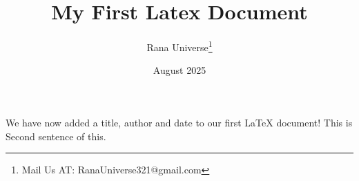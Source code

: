 \documentclass[12pt, letterpaper]{article}
\title{My First Latex Document}
\author{Rana Universe\thanks{Mail Us AT: RanaUniverse321@gmail.com}}
\date{August 2025}
\begin{document}
\maketitle

We have now added a title, author and date to our first \LaTeX{} document!
This is Second sentence of this.
\end{document}

